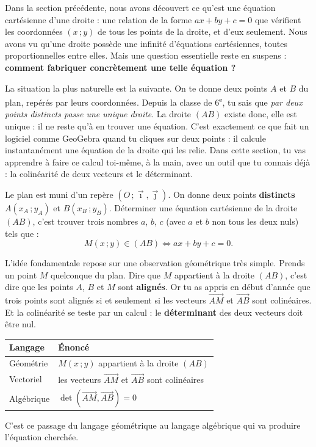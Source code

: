 \documentclass[11pt]{article}
\newcommand{\cle}[1]{{\popxbold\color{popdark}#1}}
\newcounter{popsec}
\newcounter{popsub}
\newcommand{\courssub}[1]{%
  \stepcounter{popsub}%
  \par\vspace{9pt}\noindent{\popxbold\fontsize{11.5}{13}\selectfont\color{popink}{\color{poporange}\thepopsec.\thepopsub}\hspace{6pt}#1}\par\nopagebreak\vspace{4pt}
}
\begin{document}
Dans la section précédente, nous avons découvert ce qu'est une \cle{équation cartésienne} d'une droite : une relation de la forme $ax + by + c = 0$ que vérifient les coordonnées $(x\,;y)$ de tous les points de la droite, et d'eux seulement. Nous avons vu qu'une droite possède une infinité d'équations cartésiennes, toutes proportionnelles entre elles. Mais une question essentielle reste en suspens : \textbf{comment fabriquer concrètement une telle équation ?}

La situation la plus naturelle est la suivante. On te donne deux points $A$ et $B$ du plan, repérés par leurs coordonnées. Depuis la classe de 6\textsuperscript{e}, tu sais que \emph{par deux points distincts passe une unique droite}. La droite $(AB)$ existe donc, elle est unique : il ne reste qu'à en trouver une équation. C'est exactement ce que fait un logiciel comme GeoGebra quand tu cliques sur deux points : il calcule instantanément une équation de la droite qui les relie. Dans cette section, tu vas apprendre à faire ce calcul toi-même, à la main, avec un outil que tu connais déjà : la \cle{colinéarité} de deux vecteurs et le \cle{déterminant}.

\courssub{Le problème et l'idée directrice}

\begin{definition}
Le plan est muni d'un repère $(O\,;\vec{\imath},\vec{\jmath})$. On donne deux points \textbf{distincts} $A(x_A\,;y_A)$ et $B(x_B\,;y_B)$. Déterminer une équation cartésienne de la droite $(AB)$, c'est trouver trois nombres $a$, $b$, $c$ (avec $a$ et $b$ non tous les deux nuls) tels que :
\[ M(x\,;y) \in (AB) \iff ax + by + c = 0. \]
\end{definition}

L'idée fondamentale repose sur une observation géométrique très simple. Prends un point $M$ quelconque du plan. Dire que $M$ appartient à la droite $(AB)$, c'est dire que les points $A$, $B$ et $M$ sont \textbf{alignés}. Or tu as appris en début d'année que trois points sont alignés si et seulement si les vecteurs $\overrightarrow{AM}$ et $\overrightarrow{AB}$ sont \cle{colinéaires}. Et la colinéarité se teste par un calcul : le \textbf{déterminant} des deux vecteurs doit être nul.

\begin{aretenir}
\begin{center}
\begin{tabularx}{\linewidth}{|l|X|}
\hline
\rowcolor{popblueL} \textbf{Langage} & \textbf{Énoncé} \\
\hline
Géométrie & $M(x\,;y)$ appartient à la droite $(AB)$ \\
\hline
Vectoriel & les vecteurs $\overrightarrow{AM}$ et $\overrightarrow{AB}$ sont colinéaires \\
\hline
Algébrique & $\det\left(\overrightarrow{AM},\overrightarrow{AB}\right) = 0$ \\
\hline
\end{tabularx}
\end{center}
C'est ce passage du langage géométrique au langage algébrique qui va produire l'équation cherchée.
\end{aretenir}
\end{document}
